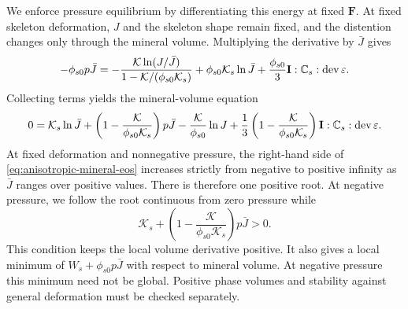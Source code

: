 We enforce pressure equilibrium by differentiating this energy at fixed
\(\mathbf F\). At fixed skeleton deformation, \(J\) and the skeleton shape
remain fixed, and the distention changes only through the mineral volume.
Multiplying the derivative by \(\bar J\) gives
\begin{equation}
 -\phi_{s0}p\bar J
 =-\frac{\mathcal{K}\ln(J/\bar J)}{1-\mathcal{K}/(\phi_{s0}\mathcal{K}_s)}
   +\phi_{s0}\mathcal{K}_s\ln\bar J
   +\frac{\phi_{s0}}3\mathbf I:\mathbb{C}_s:
                                      \operatorname{dev}\mathbf\varepsilon.
 \label{eq:anisotropic-energy-pressure-derivative}
\end{equation}
Collecting terms yields the mineral-volume equation
\begin{equation}
 0=\mathcal{K}_s\ln\bar J
   +\left(1-\frac{\mathcal{K}}{\phi_{s0}\mathcal{K}_s}\right)p\bar J
   -\frac{\mathcal{K}}{\phi_{s0}}\ln J
   +\frac13\left(1-\frac{\mathcal{K}}{\phi_{s0}\mathcal{K}_s}\right)
      \mathbf I:\mathbb{C}_s:\operatorname{dev}\mathbf\varepsilon.
 \label{eq:anisotropic-mineral-eos}
\end{equation}
At fixed deformation and nonnegative pressure, the right-hand side of
\eqref{eq:anisotropic-mineral-eos} increases strictly from negative to positive
infinity as \(\bar J\) ranges over positive values. There is therefore one positive root. At negative pressure,
we follow the root continuous from zero pressure while
\begin{equation}
 \mathcal{K}_s+\left(1-\frac{\mathcal{K}}{\phi_{s0}\mathcal{K}_s}\right)p\bar J>0.
 \label{eq:trace-mineral-stability-domain}
\end{equation}
This condition keeps the local volume derivative positive. It also gives a
local minimum of \(W_s+\phi_{s0}p\bar J\) with respect to mineral volume.
At negative pressure this minimum need not be global. Positive phase volumes
and stability against general deformation must be checked separately.

